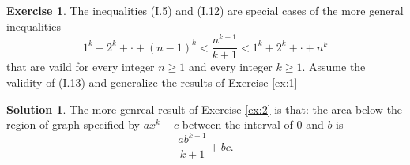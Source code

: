 \documentclass[11pt,a4paper]{book}
\theoremstyle{definition}
\newtheorem{exercise}{Exercise}
\newtheorem{solution}{Solution}
\begin{document}

\begin{exercise}
  The inequalities (I.5) and (I.12) are special cases of the more general inequalities
  \[
  \tag{I.13}  1^k + 2^k + \cdot + (n - 1)^k < \frac{n^{k+1}}{k+1} < 1^k + 2^k + \cdot + n^k
  \]
  that are vaild for every integer $n \ge 1$ and every integer $k \ge 1$. Assume the validity of (I.13) and generalize the results of Exercise \ref{ex:1}
\end{exercise}

\begin{solution}
  The more genreal result of Exercise \ref{ex:2} is that: the area below the region of 
  graph specified by $ax^k + c$ between the interval of $0$ and $b$ is 
  \[
  \frac{ab^{k+1}}{k+1} + bc.
  \]
\end{solution}
\end{document}
